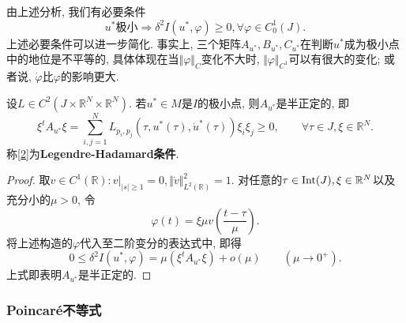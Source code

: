 由上述分析, 我们有必要条件
\begin{equation*}
    u^*\text{极小} \Rightarrow \delta^2I(u^*, \varphi) \geq 0, \forall\varphi \in C_0^1(J).
\end{equation*}
上述必要条件可以进一步简化. 事实上, 三个矩阵$A_{u^*}, B_{u^*}, C_{u^*}$在判断$u^*$成为极小点中的地位是不平等的, 具体体现在当$\Vert \varphi \Vert_C$变化不大时, $\Vert \varphi \Vert_{C^1}$可以有很大的变化;
或者说, $\dot\varphi$比$\varphi$的影响更大.

\begin{proposition}[必要条件1]
    设$L \in C^2(J \times \mathbb{R}^N \times \mathbb{R}^N)$. 若$u^* \in M$是$I$的极小点, 则$A_{u^*}$是半正定的, 即
    \begin{equation}\label{2}
        \boxed{\xi^tA_{u^*}\xi = \sum\limits_{i, j = 1}^NL_{p_i, p_j}(\tau, u^*(\tau), \dot{u}^*(\tau))\xi_i\xi_j \geq 0, \qquad \forall \tau \in J, \xi \in \mathbb{R}^N.}
    \end{equation}
    称\eqref{2}为\textbf{Legendre-Hadamard条件}.
    \begin{proof}
        取$v \in C^1(\mathbb{R})\colon v|_{|s| \geq 1} = 0, \Vert \dot v \Vert_{L^2(\mathbb{R})}^2 = 1$.
        对任意的$\tau \in {\rm Int}(J), \xi \in \mathbb{R}^N$以及充分小的$\mu > 0$, 令 
        \begin{equation*}
            \varphi(t) = \xi\mu v\left(\frac{t - \tau}{\mu}\right).
        \end{equation*}
        将上述构造的$\varphi$代入至二阶变分的表达式中, 即得 
        \begin{equation*}
            0 \leq \delta^2I(u^*, \varphi) = \mu(\xi^tA_{u^*}\xi) + o(\mu) \qquad (\mu \rightarrow 0^+). 
        \end{equation*}
        上式即表明$A_{u^*}$是半正定的.
    \end{proof}
\end{proposition}

\subsubsection{Poincaré不等式}

